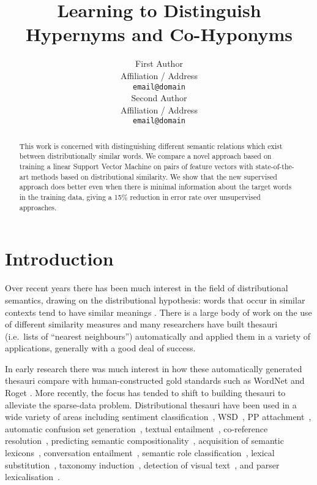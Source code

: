 \documentclass[11pt]{article}
\title{Learning to Distinguish Hypernyms and Co-Hyponyms}
\author{First Author \\
  Affiliation / Address \\
  {\tt email@domain} \\\And
  Second Author \\
  Affiliation / Address \\
  {\tt email@domain} \\}
\date{} %
\begin{document}
\maketitle

\begin{abstract}
This work is concerned with distinguishing different semantic relations which exist between distributionally similar words.  We compare a novel approach based on training a linear Support Vector Machine on pairs of feature vectors with state-of-the-art methods based on distributional similarity. We show that the new supervised approach does better even when there is minimal information about the target words in the training data, giving a 15\% reduction in error rate over unsupervised approaches.

\end{abstract}
\section{Introduction}

Over recent years there has been much interest in the field of distributional semantics, drawing on the distributional hypothesis: words that occur in similar contexts tend to have similar meanings \cite{Harris1954}.   There is a large body of work on the use of different similarity measures \cite{Lee1999,Weeds2003,Curran2004} and many researchers have built thesauri (i.e.~lists of ``nearest neighbours'') automatically and applied them in a variety of applications, generally with a good deal of success.

In early research there was much interest in how these automatically generated thesauri compare with human-constructed gold standards such as WordNet and Roget \cite{Lin1998,Kilgarriff2000}.  More recently, the focus has tended to shift to building thesauri to alleviate the sparse-data problem.  Distributional thesauri have been used in a wide variety of areas including sentiment classification~\cite{Bollegala2011}, WSD~\cite{miller-EtAl:2012:PAPERS,khapra-EtAl:2010:ACL}, PP attachment~\cite{Calvo05distributionalthesaurus}, automatic confusion set generation~\cite{xue-hwa:2012:PAPERS}, textual entailment~\cite{berant-dagan-goldberger:2010:ACL}, co-reference resolution~\cite{lee-EtAl:2012:EMNLP-CoNLL}, predicting semantic compositionality~\cite{bergsma-EtAl:2010:EMNLP}, acquisition of semantic lexicons~\cite{mcintosh:2010:EMNLP}, conversation entailment~\cite{zhang-chai:2010:EMNLP}, semantic role classification~\cite{zapirain-EtAl:2010:NAACLHLT}, lexical substitution~\cite{szarvas-biemann-gurevych:2013:NAACL-HLT}, taxonomy induction~\cite{fountain-lapata:2012:NAACL-HLT}, detection of visual text~\cite{dodge-EtAl:2012:NAACL-HLT}, and parser lexicalisation~\cite{rei-briscoe:2013:NAACL-HLT}.  
\end{document}
